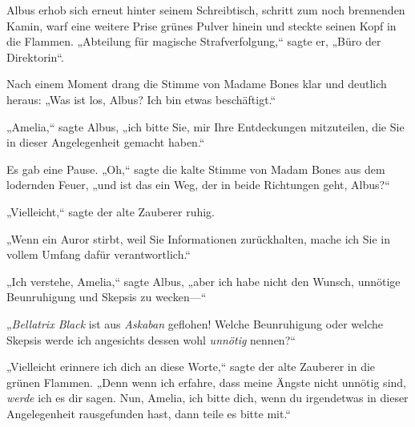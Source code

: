 Albus erhob sich erneut hinter seinem Schreibtisch, schritt zum noch brennenden Kamin, warf eine weitere Prise grünes Pulver hinein und steckte seinen Kopf in die Flammen. „Abteilung für magische Strafverfolgung,“ sagte er, „Büro der Direktorin“.

Nach einem Moment drang die Stimme von Madame Bones klar und deutlich heraus: „Was ist los, Albus? Ich bin etwas beschäftigt.“

„Amelia,“ sagte Albus, „ich bitte Sie, mir Ihre Entdeckungen mitzuteilen, die Sie in dieser Angelegenheit gemacht haben.“

Es gab eine Pause. „Oh,“ sagte die kalte Stimme von Madam Bones aus dem lodernden Feuer, „und ist das ein Weg, der in beide Richtungen geht, Albus?“

„Vielleicht,“ sagte der alte Zauberer ruhig.

„Wenn ein Auror stirbt, weil Sie Informationen zurückhalten, mache ich Sie in vollem Umfang dafür verantwortlich.“

„Ich verstehe, Amelia,“ sagte Albus, „aber ich habe nicht den Wunsch, unnötige Beunruhigung und Skepsis zu wecken—“

„\emph{Bellatrix Black} ist aus \emph{Askaban} geflohen! Welche Beunruhigung oder welche Skepsis werde ich angesichts dessen wohl \emph{unnötig} nennen?“

„Vielleicht erinnere ich dich an diese Worte,“ sagte der alte Zauberer in die grünen Flammen. „Denn wenn ich erfahre, dass meine Ängste nicht unnötig sind, \emph{werde} ich es dir sagen. Nun, Amelia, ich bitte dich, wenn du irgendetwas in dieser Angelegenheit rausgefunden hast, dann teile es bitte mit.“

